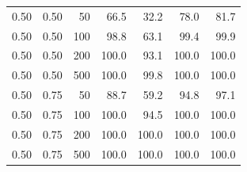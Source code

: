 \begin{tabular}{@{}rrr rrrr@{}}
0.50 & 0.50 & 50 & 66.5 & 32.2 & 78.0 & 81.7 \\
0.50 & 0.50 & 100 & 98.8 & 63.1 & 99.4 & 99.9 \\
0.50 & 0.50 & 200 & 100.0 & 93.1 & 100.0 & 100.0 \\
0.50 & 0.50 & 500 & 100.0 & 99.8 & 100.0 & 100.0 \\
0.50 & 0.75 & 50 & 88.7 & 59.2 & 94.8 & 97.1 \\
0.50 & 0.75 & 100 & 100.0 & 94.5 & 100.0 & 100.0 \\
0.50 & 0.75 & 200 & 100.0 & 100.0 & 100.0 & 100.0 \\
0.50 & 0.75 & 500 & 100.0 & 100.0 & 100.0 & 100.0 \\
\bottomrule
\end{tabular}
